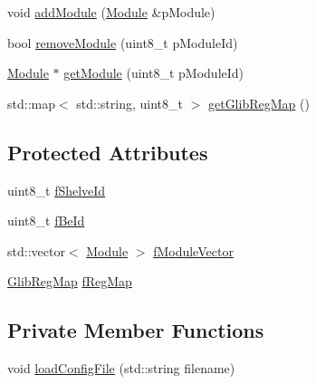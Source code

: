 \begin{DoxyCompactItemize}
void \hyperlink{class_ph2___hw_description_1_1_glib_a1bbf1eb3a5d4efca9801d2eaca6f33f7}{add\-Module} (\hyperlink{class_ph2___hw_description_1_1_module}{Module} \&p\-Module)
\item 
bool \hyperlink{class_ph2___hw_description_1_1_glib_a64d98cba80674893dff1a91c69b0f34e}{remove\-Module} (uint8\-\_\-t p\-Module\-Id)
\item 
\hyperlink{class_ph2___hw_description_1_1_module}{Module} $\ast$ \hyperlink{class_ph2___hw_description_1_1_glib_a41e024e9138acdcb856c0f5c8c43be43}{get\-Module} (uint8\-\_\-t p\-Module\-Id)
\item 
std\-::map$<$ std\-::string, uint8\-\_\-t $>$ \hyperlink{class_ph2___hw_description_1_1_glib_a971d4ea45771b8f93ca81bc794613262}{get\-Glib\-Reg\-Map} ()
\end{DoxyCompactItemize}
\subsection*{Protected Attributes}
\begin{DoxyCompactItemize}
\item 
uint8\-\_\-t \hyperlink{class_ph2___hw_description_1_1_glib_abcaa5b1cb716d3aa814688dd5691a421}{f\-Shelve\-Id}
\item 
uint8\-\_\-t \hyperlink{class_ph2___hw_description_1_1_glib_ac89e9a9eee11e41f901e90c619e50bfc}{f\-Be\-Id}
\item 
std\-::vector$<$ \hyperlink{class_ph2___hw_description_1_1_module}{Module} $>$ \hyperlink{class_ph2___hw_description_1_1_glib_a97b6535900b4fa8eef81c7e15a01cda4}{f\-Module\-Vector}
\item 
\hyperlink{namespace_ph2___hw_description_afc0e75a92548c3406e89bf39ca4c9bfb}{Glib\-Reg\-Map} \hyperlink{class_ph2___hw_description_1_1_glib_a1a0c6dba5a24c615e8609b03012a8970}{f\-Reg\-Map}
\end{DoxyCompactItemize}
\subsection*{Private Member Functions}
\begin{DoxyCompactItemize}
\item 
void \hyperlink{class_ph2___hw_description_1_1_glib_a2eb8576c349ced2ac44904179294bd42}{load\-Config\-File} (std\-::string filename)
\end{DoxyCompactItemize}


